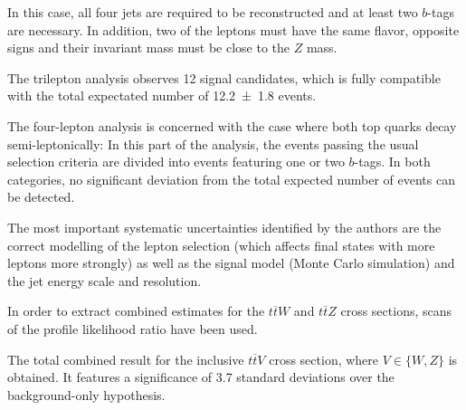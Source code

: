 In this case, all four jets are required to be reconstructed and at least two $b$-tags are necessary.
In addition, two of the leptons must have the same flavor, opposite signs and their invariant mass must be close to the $Z$ mass.

The trilepton analysis observes 12 signal candidates, which is fully compatible with the total expectated number of \num{12.2\pm1.8} events.

The four-lepton analysis is concerned with the case where both top quarks decay semi-leptonically:
In this part of the analysis, the events passing the usual selection criteria are divided into events featuring one or two $b$-tags.
In both categories, no significant deviation from the total expected number of events can be detected.

The most important systematic uncertainties identified by the authors are the correct modelling of the lepton selection (which affects final states with more leptons more strongly) as well as the signal model (Monte Carlo simulation) and the jet energy scale and resolution.

In order to extract combined estimates for the $t\overline{t}W$ and $t\overline{t}Z$ cross sections, scans of the profile likelihood ratio have been used.

The total combined result for the inclusive $t\overline{t}V$ cross section, where $V\in\{W,Z\}$ is obtained.
It features a significance of \num{3.7} standard deviations over the background-only hypothesis.

